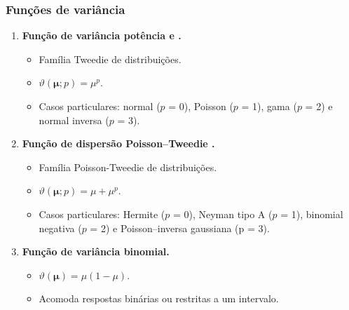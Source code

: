 \documentclass[10pt,
  aspectratio=169,
  serif,
  mathserif,
  professionalfont,
  compress,
  handout,
  ]{beamer}\usepackage[]{graphicx}\usepackage[]{color}
\begin{document}
\begin{frame}

  \frametitle{Funções de variância}
  
  \begin{enumerate}
  \item \textbf{Função de variância potência \cite{Jorgensen87} e \cite{Jorgensen97}. }
  
    \begin{itemize}
      \item Família Tweedie de distribuições.
      \item $\vartheta\left(\boldsymbol{\mu}; p\right) = \mu^p$.
      \item Casos particulares: normal ($p$ = 0), Poisson ($p$ = 1), gama ($p$ = 2) e normal inversa ($p$ = 3).
    \end{itemize}

  
  \item \textbf{Função de dispersão Poisson–Tweedie \cite{Jorgensen15}.}
  
    \begin{itemize}
      \item Família Poisson-Tweedie de distribuições.
      \item $\vartheta\left(\boldsymbol{\mu}; p\right) = \mu + \mu^p$.
      \item Casos particulares: Hermite ($p$ = 0), Neyman tipo A ($p$ = 1), binomial negativa ($p$ = 2) e Poisson–inversa gaussiana (p = $3$).
      
    \end{itemize}

  \item \textbf{Função de variância binomial.} 
  
    \begin{itemize}
      \item $\vartheta(\boldsymbol{\mu}) = \mu(1 - \mu)$.
      \item Acomoda respostas binárias ou restritas a um intervalo.
    \end{itemize}

\end{enumerate}

\end{frame}

\end{document}

